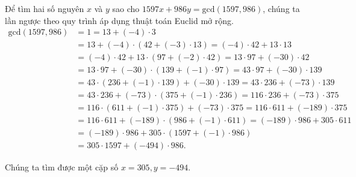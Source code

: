 \begin{example}
	Để tìm hai số nguyên $x$ và $y$ sao cho $1597 x + 986 y = \text{gcd}(1597, 986)$, chúng ta lần ngược theo quy trình áp dụng thuật toán Euclid mở rộng.
	\begin{align*}
		\text{gcd}(1597, 986) & = 1 = 13 + (-4)\cdot 3                                                               \\
		                      & = 13 + (-4)\cdot (42 + (-3)\cdot 13) = (-4)\cdot 42 + 13\cdot 13                     \\
		                      & = (-4)\cdot 42 + 13\cdot (97 + (-2)\cdot 42) = 13\cdot 97 + (-30)\cdot 42            \\
		                      & = 13\cdot 97 + (-30)\cdot (139 + (-1)\cdot 97) = 43\cdot 97 + (-30)\cdot 139         \\
		                      & = 43\cdot (236 + (-1)\cdot 139) + (-30)\cdot 139 = 43\cdot 236 + (-73)\cdot 139      \\
		                      & = 43\cdot 236 + (-73)\cdot (375 + (-1)\cdot 236) = 116\cdot 236 + (-73)\cdot 375     \\
		                      & = 116\cdot (611 + (-1)\cdot 375) + (-73)\cdot 375 = 116\cdot 611 + (-189)\cdot 375   \\
		                      & = 116\cdot 611 + (-189)\cdot (986 + (-1)\cdot 611)  = (-189)\cdot 986 + 305\cdot 611 \\
		                      & = (-189)\cdot 986 + 305\cdot (1597 + (-1)\cdot 986)                                  \\
		                      & = 305\cdot 1597 + (-494)\cdot 986.
	\end{align*}

	Chúng ta tìm được một cặp số $x = 305, y = -494$.
\end{example}

